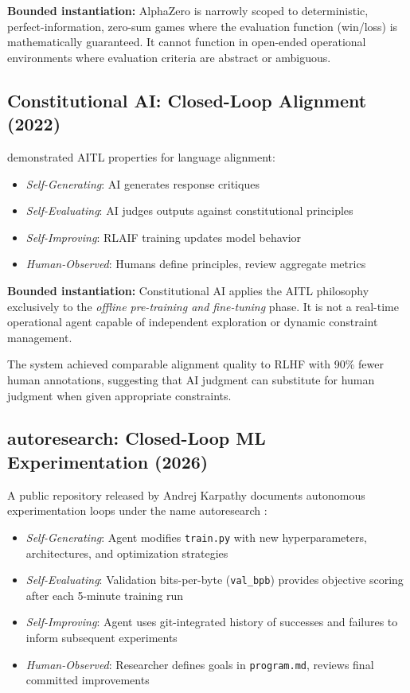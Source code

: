 \documentclass[11pt]{article}
\begin{document}
\textbf{Bounded instantiation:} AlphaZero is narrowly scoped to deterministic, perfect-information, zero-sum games where the evaluation function (win/loss) is mathematically guaranteed. It cannot function in open-ended operational environments where evaluation criteria are abstract or ambiguous.

\subsection{Constitutional AI: Closed-Loop Alignment (2022)}

\citet{bai2022constitutional} demonstrated AITL properties for language alignment:
\begin{itemize}[nosep]
  \item \emph{Self-Generating}: AI generates response critiques
  \item \emph{Self-Evaluating}: AI judges outputs against constitutional principles
  \item \emph{Self-Improving}: RLAIF training updates model behavior
  \item \emph{Human-Observed}: Humans define principles, review aggregate metrics
\end{itemize}

\textbf{Bounded instantiation:} Constitutional AI applies the AITL philosophy exclusively to the \emph{offline pre-training and fine-tuning} phase. It is not a real-time operational agent capable of independent exploration or dynamic constraint management.

The system achieved comparable alignment quality to RLHF with 90\% fewer human annotations, suggesting that AI judgment can substitute for human judgment when given appropriate constraints.

\subsection{autoresearch: Closed-Loop ML Experimentation (2026)}

A public repository released by Andrej Karpathy documents autonomous experimentation loops under the name autoresearch \citep{karpathy2026autoresearch}:
\begin{itemize}[nosep]
  \item \emph{Self-Generating}: Agent modifies \texttt{train.py} with new hyperparameters, architectures, and optimization strategies
  \item \emph{Self-Evaluating}: Validation bits-per-byte (\texttt{val\_bpb}) provides objective scoring after each 5-minute training run
  \item \emph{Self-Improving}: Agent uses git-integrated history of successes and failures to inform subsequent experiments
  \item \emph{Human-Observed}: Researcher defines goals in \texttt{program.md}, reviews final committed improvements
\end{itemize}
\end{document}
